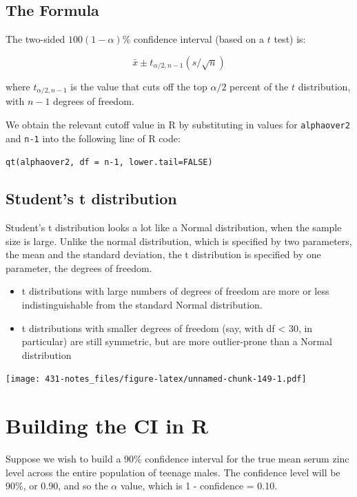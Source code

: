 \documentclass[
]{book}
\providecommand{\tightlist}{%
  \setlength{\itemsep}{0pt}\setlength{\parskip}{0pt}}
\begin{document}
\hypertarget{the-formula}{%
\subsection{The Formula}\label{the-formula}}

The two-sided \(100(1-\alpha)\)\% confidence interval (based on a \(t\) test) is:

\[\bar{x} \pm t_{\alpha/2, n-1}(s / \sqrt{n})\]

where \(t_{\alpha/2, n-1}\) is the value that cuts off the top \(\alpha/2\) percent of the \(t\) distribution, with \(n - 1\) degrees of freedom.

We obtain the relevant cutoff value in R by substituting in values for \texttt{alphaover2} and \texttt{n-1} into the following line of R code:

\texttt{qt(alphaover2,\ df\ =\ n-1,\ lower.tail=FALSE)}

\hypertarget{students-t-distribution}{%
\subsection{Student's t distribution}\label{students-t-distribution}}

Student's t distribution looks a lot like a Normal distribution, when the sample size is large. Unlike the normal distribution, which is specified by two parameters, the mean and the standard deviation, the t distribution is specified by one parameter, the degrees of freedom.

\begin{itemize}
\tightlist
\item
  t distributions with large numbers of degrees of freedom are more or less indistinguishable from the standard Normal distribution.
\item
  t distributions with smaller degrees of freedom (say, with df \textless{} 30, in particular) are still symmetric, but are more outlier-prone than a Normal distribution
\end{itemize}

\texttt{[image: 431-notes\_files/figure-latex/unnamed-chunk-149-1.pdf]}

\hypertarget{building-the-ci-in-r}{%
\section{Building the CI in R}\label{building-the-ci-in-r}}

Suppose we wish to build a 90\% confidence interval for the true mean serum zinc level across the entire population of teenage males. The confidence level will be 90\%, or 0.90, and so the \(\alpha\) value, which is 1 - confidence = 0.10.
\end{document}
